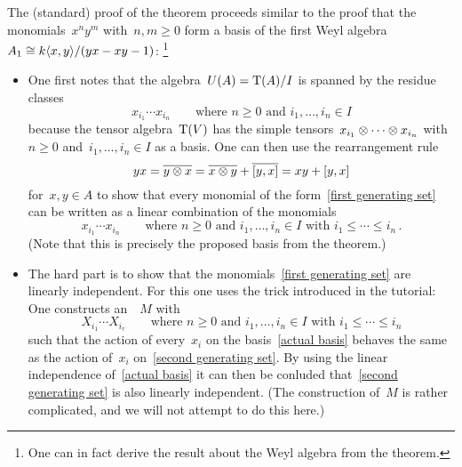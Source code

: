 The (standard) proof of the {\pbw} theorem proceeds similar to the proof that the monomials~$x^n y^m$ with~$n, m \geq 0$ form a basis of the first Weyl algebra~$A_1 \cong k\langle x, y\rangle/(yx - xy - 1)$:%
\footnote{One can in fact derive the result about the Weyl algebra from the {\pbw} theorem.}
\begin{itemize}
  \item
    One first notes that the algebra~$U(A) = \operatorname{T}(A)/I$ is spanned by the residue classes
    \begin{equation}
      \label{first generating set}
      x_{i_1} \dotsm x_{i_n}
      \qquad
      \text{where~$n \geq 0$ and~$i_1, \dotsc, i_n \in I$}
    \end{equation}
    because the tensor algebra~$\operatorname{T}(V)$ has the simple tensors~$x_{i_1} \otimes \dotsb \otimes x_{i_n}$ with~$n \geq 0$ and~$i_1, \dotsc, i_n \in I$ as a basis.
    One can then use the rearrangement rule
    \[
        y x
      = \overline{y \otimes x}
      = \overline{x \otimes y} + \overline{[y,x]}
      = x y + [y,x]
    \]
    for~$x, y \in A$ to show that every monomial of the form~\eqref{first generating set} can be written as a linear combination of the monomials
    \begin{equation}
      \label{second generating set}
      x_{i_1} \dotsm x_{i_n}
      \qquad
      \text{where~$n \geq 0$ and~$i_1, \dotsc, i_n \in I$ with~$i_1 \leq \dotsb \leq i_n$} \,.
    \end{equation}
    (Note that this is precisely the proposed basis from the {\pbw} theorem.)
  \item
    The hard part is to show that the monomials~\eqref{first generating set} are linearly independent.
    For this one uses the trick introduced in the tutorial:
    One constructs an~{}~$M$ with~{\kbasis}
    \begin{equation}
      \label{actual basis}
      X_{i_1} \dotsm X_{i_r}
      \qquad
      \text{where~$n \geq 0$ and~$i_1, \dotsc, i_n \in I$ with~$i_1 \leq \dotsb \leq i_n$}
    \end{equation}
    such that the action of every~$x_i$ on the basis~\eqref{actual basis} behaves the same as the action of~$x_i$ on~\eqref{second generating set}.
    By using the linear independence of~\eqref{actual basis} it can then be conluded that~\eqref{second generating set} is also linearly independent.
    (The construction of~$M$ is rather complicated, and we will not attempt to do this here.)
\end{itemize}


